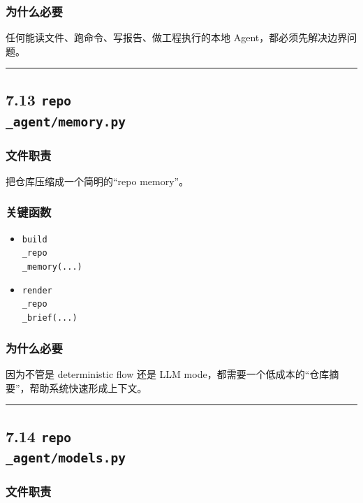 \documentclass[UTF8,12pt,openany]{ctexbook}
\begin{document}
\subsubsection{为什么必要}

任何能读文件、跑命令、写报告、做工程执行的本地 Agent，都必须先解决边界问题。\par

\hrule

\subsection{7.13 \texttt{repo\\_agent/memory.py}}

\subsubsection{文件职责}

把仓库压缩成一个简明的“repo memory”。\par

\subsubsection{关键函数}

\begin{itemize}
\item \texttt{build\\_repo\\_memory(...)}
\item \texttt{render\\_repo\\_brief(...)}
\end{itemize}

\subsubsection{为什么必要}

因为不管是 deterministic flow 还是 LLM mode，都需要一个低成本的“仓库摘要”，帮助系统快速形成上下文。\par

\hrule

\subsection{7.14 \texttt{repo\\_agent/models.py}}

\subsubsection{文件职责}
\end{document}
